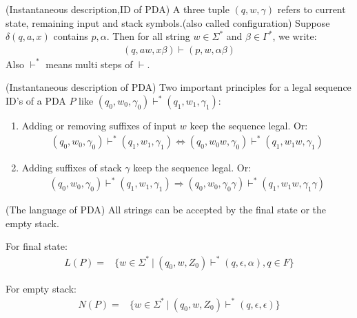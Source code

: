         \begin{definition}
            (Instantaneous description,ID of PDA) A three tuple $(q,w,\gamma)$ refers to current state, remaining input and stack symbols.(also called configuration) Suppose $\delta(q,a,x)$ contains $p,\alpha$. Then for all string $w\in \Sigma^{*}$ and $\beta\in \Gamma^{*}$, we write:
            \begin{align}
                (q,aw,x\beta)\vdash(p,w,\alpha\beta)\nonumber
            \end{align}
            Also $\vdash^{*}$ means multi steps of $\vdash$.
        \end{definition}
        \begin{theorem}
            (Instantaneous description of PDA) Two important principles for a legal sequence ID's of a PDA $P$ like $(q_0,w_0,\gamma_0)\vdash^{*}(q_1,w_1,\gamma_1)$:
            \begin{enumerate}
                \item Adding or removing suffixes of input $w$ keep the sequence legal. Or:
                    \begin{align}
                        (q_0,w_0,\gamma_0)\vdash^{*}(q_1,w_1,\gamma_1)\Leftrightarrow(q_0,w_0w,\gamma_0)\vdash^{*}(q_1,w_1w,\gamma_1)\nonumber
                    \end{align}
                \item Adding suffixes of stack $\gamma$ keep the sequence legal. Or:
                    \begin{align}
                        (q_0,w_0,\gamma_0)\vdash^{*}(q_1,w_1,\gamma_1)\Rightarrow(q_0,w_0,\gamma_0\gamma)\vdash^{*}(q_1,w_1w,\gamma_1\gamma)\nonumber
                    \end{align}
            \end{enumerate}
        \end{theorem}
        \begin{definition}
            (The language of PDA) All strings can be accepted by the final state or the empty stack.

            For final state:
            \begin{align}
                L(P)=&\{w\in \Sigma^{*}\ |\ (q_0,w,Z_0)\vdash^{*}(q,\epsilon,\alpha),q\in F\}\nonumber
            \end{align}

            For empty stack:
            \begin{align}
                N(P)=&\{w\in \Sigma^{*}\ |\ (q_0,w,Z_0)\vdash^{*}(q,\epsilon,\epsilon)\}\nonumber
            \end{align}
        \end{definition}
